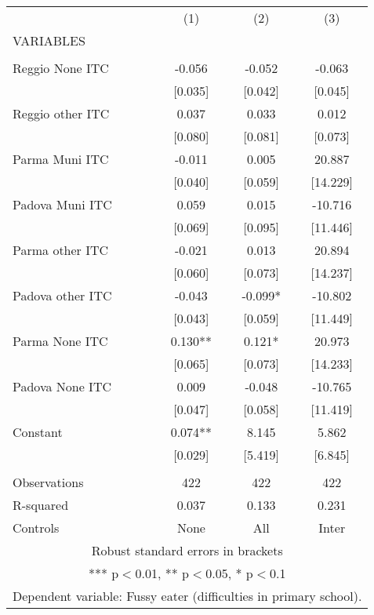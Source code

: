 \begin{tabular}{lccc} \hline
 & (1) & (2) & (3) \\
VARIABLES &  &  &  \\ \hline
 &  &  &  \\
Reggio None ITC & -0.056 & -0.052 & -0.063 \\
 & [0.035] & [0.042] & [0.045] \\
Reggio other ITC & 0.037 & 0.033 & 0.012 \\
 & [0.080] & [0.081] & [0.073] \\
Parma Muni ITC & -0.011 & 0.005 & 20.887 \\
 & [0.040] & [0.059] & [14.229] \\
Padova Muni ITC & 0.059 & 0.015 & -10.716 \\
 & [0.069] & [0.095] & [11.446] \\
Parma other ITC & -0.021 & 0.013 & 20.894 \\
 & [0.060] & [0.073] & [14.237] \\
Padova other ITC & -0.043 & -0.099* & -10.802 \\
 & [0.043] & [0.059] & [11.449] \\
Parma None ITC & 0.130** & 0.121* & 20.973 \\
 & [0.065] & [0.073] & [14.233] \\
Padova None ITC & 0.009 & -0.048 & -10.765 \\
 & [0.047] & [0.058] & [11.419] \\
Constant & 0.074** & 8.145 & 5.862 \\
 & [0.029] & [5.419] & [6.845] \\
 &  &  &  \\
Observations & 422 & 422 & 422 \\
R-squared & 0.037 & 0.133 & 0.231 \\
 Controls & None & All & Inter \\ \hline
\multicolumn{4}{c}{ Robust standard errors in brackets} \\
\multicolumn{4}{c}{ *** p$<$0.01, ** p$<$0.05, * p$<$0.1} \\
\multicolumn{4}{c}{ Dependent variable: Fussy eater (difficulties in primary school).} \\
\end{tabular}
